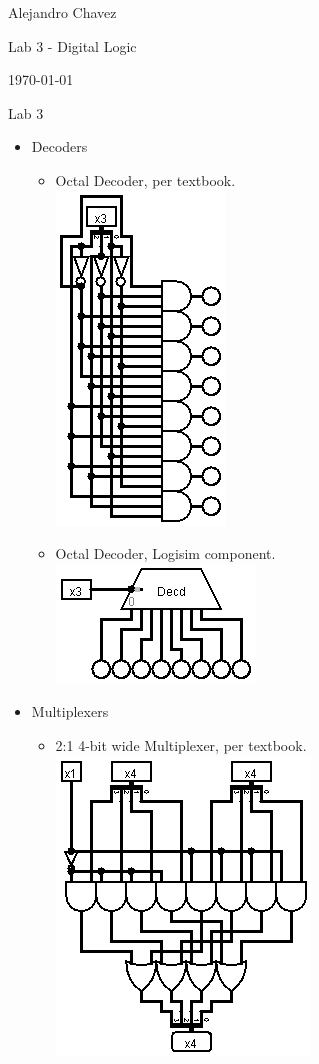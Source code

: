 \documentclass{article}
\begin{document}
\hfill Alejandro Chavez

\hfill Lab 3 - Digital Logic

\hfill \today\\

\begin{center}\begin{large}Lab 3\end{large}\end{center}\begin{itemize}
	\item
		Decoders
	\begin{itemize}
		\item
			Octal Decoder, per textbook.\\
      \includegraphics[scale=0.5]{lab3decoder1.png}
		\item
			Octal Decoder, Logisim component.\\
      \includegraphics[scale=0.5]{lab3decoder2.png}
	\end{itemize}
	\item
		Multiplexers
	\begin{itemize}
		\item
			2:1 4-bit wide Multiplexer, per textbook.\\
      \includegraphics[scale=0.5]{lab3multiplexer1.png}

\end{itemize}
\end{itemize}
\end{document}
